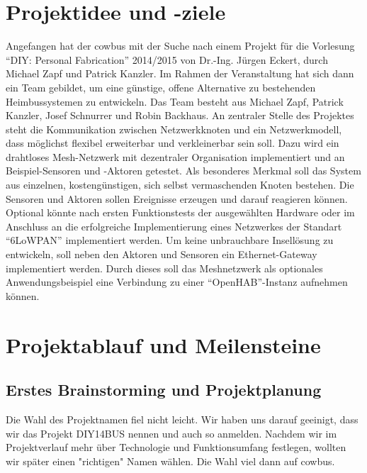 \documentclass{IEEEtran}
\begin{document}
\section{Projektidee und -ziele}

    Angefangen hat der cowbus mit der Suche nach einem Projekt für die Vorlesung 
    \enquote{DIY: Personal Fabrication} 2014/2015 von Dr.-Ing. Jürgen Eckert, durch 
    Michael Zapf und Patrick Kanzler. 
    Im Rahmen der Veranstaltung hat sich dann ein Team gebildet, um eine günstige, 
    offene Alternative zu bestehenden Heimbussystemen zu entwickeln. Das Team besteht 
    aus Michael Zapf, Patrick Kanzler, Josef Schnurrer und Robin Backhaus. 
    An zentraler Stelle des Projektes steht die Kommunikation zwischen Netzwerkknoten 
    und ein Netzwerkmodell, dass möglichst flexibel erweiterbar und verkleinerbar 
    sein soll. 
    Dazu wird ein drahtloses Mesh-Netzwerk mit dezentraler Organisation implementiert 
    und an Beispiel-Sensoren und -Aktoren getestet. 
    Als besonderes Merkmal soll das System aus einzelnen, kostengünstigen, sich 
    selbst vermaschenden Knoten bestehen.
    Die Sensoren und Aktoren sollen Ereignisse erzeugen und darauf reagieren können. 
    Optional könnte nach ersten Funktionstests der ausgewählten Hardware oder im 
    Anschluss an die erfolgreiche Implementierung eines Netzwerkes der Standart 
    \enquote{6LoWPAN} implementiert werden. 
    Um keine unbrauchbare Insellösung zu entwickeln, soll neben den Aktoren und 
    Sensoren ein Ethernet-Gateway implementiert werden. Durch dieses soll das 
    Meshnetzwerk als optionales Anwendungsbeispiel eine Verbindung zu 
    einer \enquote{OpenHAB}-Instanz aufnehmen können.

\section{Projektablauf und Meilensteine}

    \subsection{Erstes Brainstorming und Projektplanung}

        Die Wahl des Projektnamen fiel nicht leicht. Wir haben uns darauf geeinigt, dass 
        wir das Projekt DIY14BUS nennen und auch so anmelden. Nachdem wir im 
        Projektverlauf mehr über Technologie und Funktionsumfang festlegen, wollten wir 
        später einen "richtigen" Namen wählen. Die Wahl viel dann auf cowbus.
\end{document}

